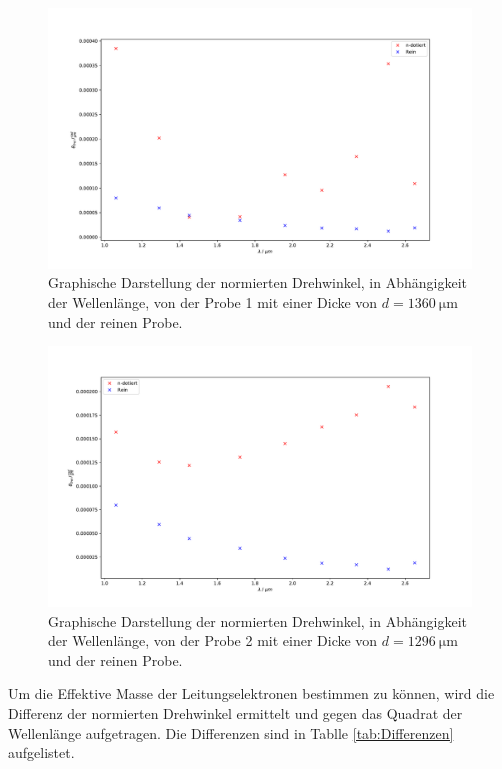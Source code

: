 \begin{figure}
  \centering
  \includegraphics[width = \textwidth,keepaspectratio]{figure/Theta1_plot.pdf}
  \caption{Graphische Darstellung der normierten Drehwinkel, in Abhängigkeit der Wellenlänge, von der Probe 1 mit einer Dicke von $d=\SI{1360}{\micro\meter}$ und 
  der reinen Probe.}
  \label{fig:Drehwinkel_1}
\end{figure}
\begin{figure}
  \centering
  \includegraphics[width = \textwidth,keepaspectratio]{figure/Theta2_plot.pdf}
  \caption{Graphische Darstellung der normierten Drehwinkel, in Abhängigkeit der Wellenlänge, von der Probe 2 mit einer Dicke von $d=\SI{1296}{\micro\meter}$ und 
  der reinen Probe.}
  \label{fig:Drehwinkel_2}
\end{figure}
\FloatBarrier
Um die  Effektive Masse der Leitungselektronen bestimmen zu können, wird die Differenz der normierten Drehwinkel ermittelt
und gegen das Quadrat der Wellenlänge aufgetragen. Die Differenzen sind in Tablle \ref{tab:Differenzen} aufgelistet.
